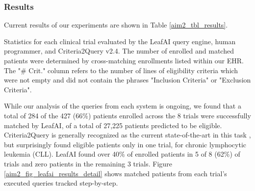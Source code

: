 \documentclass[../main.tex]{subfiles}
\begin{document}
\subsubsection{Results}

Current results of our experiments are shown in Table \ref{aim2_tbl_results}. 

\begin{table}[h!]
    \footnotesize
    \centering
    
    \caption{Statistics for each clinical trial evaluated by the LeafAI query engine, human programmer, and Criteria2Query v2.4. The number of enrolled and matched patients were determined by cross-matching enrollments listed within our EHR. The "\# Crit." column refers to the number of lines of eligibility criteria which were not empty and did not contain the phrases "Inclusion Criteria" or "Exclusion Criteria".}
    \label{aim2_tbl_results}
\end{table} 

While our analysis of the queries from each system is ongoing, we found that a total of 284 of the 427 (66\%) patients enrolled across the 8 trials were successfully matched by LeafAI, of a total of 27,225 patients predicted to be eligible. Criteria2Query is generally recognized as the current state-of-the-art in this task \cite{tseo2020information, zhang2020deepenroll, gao2020compose}, but surprisingly found eligible patients only in one trial, for chronic lymphocytic leukemia (CLL). LeafAI found over 40\% of enrolled patients in 5 of 8 (62\%) of trials and zero patients in the remaining 3 trials. Figure \ref{aim2_fig_leafai_results_detail} shows matched patients from each trial's executed queries tracked step-by-step.
\end{document}

